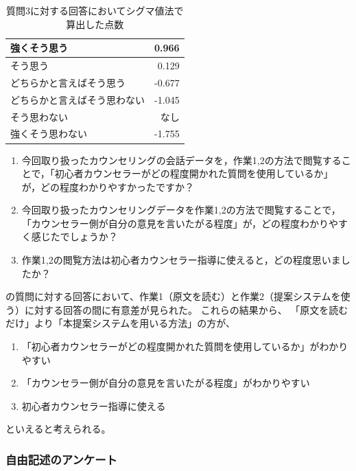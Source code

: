 \documentclass[shuuron]{kuee}
\begin{document}
\begin{table}
  \caption{質問3に対する回答においてシグマ値法で算出した点数}
  \label{table:sigma2}
  \begin{center}
    \begin{tabular}{|l|r|} \hline
      強くそう思う & 0.966 \\ \hline
      そう思う  & 0.129 \\ \hline
      どちらかと言えばそう思う & -0.677 \\ \hline
      どちらかと言えばそう思わない & -1.045 \\ \hline
      そう思わない  & なし \\ \hline
      強くそう思わない & -1.755 \\ \hline
    \end{tabular}
  \end{center}
\end{table}


\begin{enumerate}

  \item 今回取り扱ったカウンセリングの会話データを，作業1,2の方法で閲覧することで，「初心者カウンセラーがどの程度開かれた質問を使用しているか」が，どの程度わかりやすかったですか？
  \item 今回取り扱ったカウンセリングデータを作業1,2の方法で閲覧することで，「カウンセラー側が自分の意見を言いたがる程度」が，どの程度わかりやすく感じたでしょうか？
  \item 作業1,2の閲覧方法は初心者カウンセラー指導に使えると，どの程度思いましたか？
\end{enumerate}

の質問に対する回答において、作業1（原文を読む）と作業2（提案システムを使う）に対する回答の間に有意差が見られた。
これらの結果から、
「原文を読むだけ」より「本提案システムを用いる方法」の方が、
\begin{enumerate}

  \item 「初心者カウンセラーがどの程度開かれた質問を使用しているか」がわかりやすい
  \item 「カウンセラー側が自分の意見を言いたがる程度」がわかりやすい
  \item 初心者カウンセラー指導に使える
\end{enumerate}
といえると考えられる。


\subsubsection{自由記述のアンケート}
\end{document}

